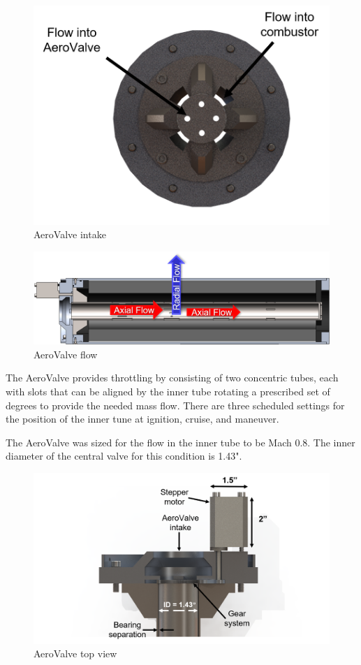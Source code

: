 \begin{figure}[H]
    \centering
    \includegraphics[width=0.7\linewidth]{AeroValve_Figures/bypass_intake.png}
    \caption{AeroValve intake}
    \label{fig:intake}
\end{figure}

\begin{figure}[H]
    \centering
    \includegraphics[width=0.7\linewidth]{AeroValve_Figures/bypass_flow.png}
    \caption{AeroValve flow}
    \label{fig:bypassflow}
\end{figure}

The AeroValve provides throttling by consisting of two concentric tubes, each with slots that can be aligned by the inner tube rotating a prescribed set of degrees to provide the needed mass flow. There are three scheduled settings for the position of the inner tune at ignition, cruise, and maneuver. 

The AeroValve was sized for the flow in the inner tube to be Mach 0.8. The inner diameter of the central valve for this condition is 1.43".  

\begin{figure}[H]
    \centering
    \includegraphics[width=0.7\linewidth]{Combustor_Figures/topview.png}
    \caption{AeroValve top view}
    \label{fig:topview}
\end{figure}

